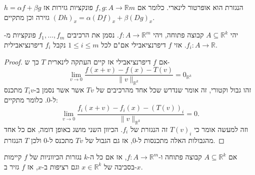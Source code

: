 \documentclass{tstextbook}
\begin{document}
\begin{proposition}
הנגזרת הוא אופרטור לינארי. כלומר אם \(f,g:A\to\mathbb{R}m\) פונקציות גזירות אז \(h=\alpha f+\beta g\) גזירה וכן מתקיים \((Dh)_{x}=\alpha (Df)_{x}+\beta (Dg)_{x}\).

\end{proposition}
\begin{proposition}
יהי \(A\subseteq \mathbb{R}^k\) קבוצה פתוחה, ויהי \(f:A\to\mathbb{R}^m\). נסמן את הרכיבים \(f_{1},\dots,f_{m}\) פונקציות מ-\(f_{i}:A\to\mathbb{R}\). אזי \(f\) דיפרנציאבילי אם"ם לכל \(1\leq i\leq m\) נקבל \(f_{i}\) דיפרנציאבילית.

\end{proposition}
\begin{proof}
אם \(f\) דיפרנציאבילי אז קיים העתקה לינארית \(T\) כך ש-
$$\operatorname*{lim}_{ v \to0}{\frac{f\left( x+ v  \right)-f(x)-T\left(  v  \right)}{\| v \|_{\mathbb{R}^{k}}}}=0_{\mathbb{R}^k}$$
זהו גבול וקטורי, זה אומר שנדרש שכל אחד מהרכיבים של \(Tv\) אשר אשר נסמן ב-\(T_{i}v\) מתכנס ל-0. כלומר מתקיים:
$$\operatorname*{lim}_{ v \to0}{\frac{f_{i}(x+ v )-f_{i}(x)-(T( v ))_{i}}{\| v \|_{\mathbb{R}^{k}}}}=0.$$
וזה למעשה אומר כי \(T(v)_{i}\) זה הנגזרת של \(f_{i}\). הכיוון השני מושג באופן דומה, אם כל אחד מהגבולות האלה מתכנסות ל-0, אז גם הגבול של \(Tv\) מתכנס ל-0 ולכן \(T\) הנגזרת.

\end{proof}
\begin{theorem}
אם \(A\subseteq \mathbb{R}^k\) קבוצה פתוחה ו-\(f:A\to\mathbb{R}^m\), אז אם כל ה-\(k\) נגזרות הכיווניות של \(f\) קיימות בסביבה של \(x \in\mathbb{R}^k\) וגם רציפות ב-\(x\), אז \(f\) גזיר ב-\(x\).

\end{theorem}
\end{document}
